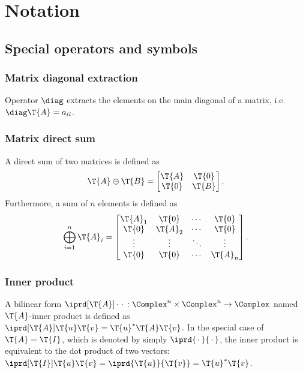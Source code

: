 \chapter{Notation}
\section{Special operators and symbols}
\subsection*{Matrix diagonal extraction}
Operator $\diag$ extracts the elements on the
main diagonal of a matrix, i.e.\
$\diag\T{A} = a_{ii}$.

\subsection*{Matrix direct sum}
A direct sum of two matrices is defined as
\begin{equation}
  \T{A} \oplus \T{B} =
  \begin{bmatrix}
    \T{A} & \T{0} \\
    \T{0} & \T{B}
  \end{bmatrix}.
\end{equation}
Furthermore, a sum of $n$ elements is defined as
\begin{equation}
  \bigoplus_{i = 1}^n \T{A}_i =
  \begin{bmatrix}
    \T{A}_1 & \T{0}   & \cdots & \T{0}   \\
    \T{0}   & \T{A}_2 & \cdots & \T{0}   \\
    \vdots  & \vdots  & \ddots & \vdots  \\
    \T{0}   & \T{0}   & \cdots & \T{A}_n
  \end{bmatrix}.
\end{equation}

\subsection*{Inner product}
A bilinear form $\iprd[\T{A}]{\,\cdot\,}{\,\cdot\,}  : \Complex^n \times \Complex^n \to \Complex$
named $\T{A}$-inner product is defined as $\iprd[\T{A}]{\T{u}}{\T{v}} = \T{u}^* \T{A} \T{v}$.
In the special case of $\T{A} = \T{I}$, which is denoted by simply
$\iprd{\,\cdot\,}{\,\cdot\,}$, the
inner product is equivalent to the dot product of two vectors:
$\iprd[\T{I}]{\T{u}}{\T{v}} = \iprd{\T{u}}{\T{v}} = \T{u}^* \T{v}$.

\section{\nameCaSymbols}

